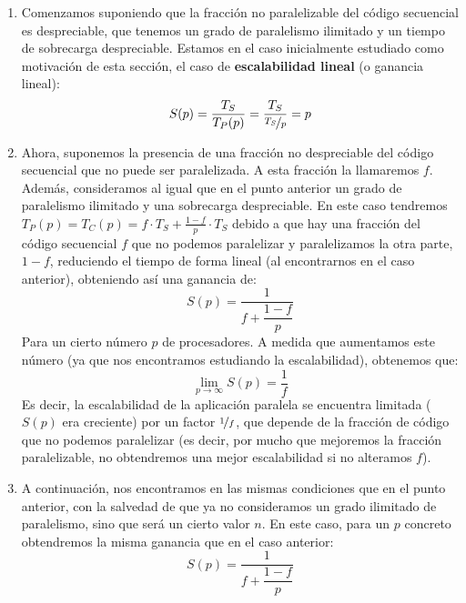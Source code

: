 \begin{enumerate}
    \item Comenzamos suponiendo que la fracción no paralelizable del código secuencial es despreciable, que tenemos un grado de paralelismo ilimitado y un tiempo de sobrecarga despreciable. Estamos en el caso inicialmente estudiado como motivación de esta sección, el caso de \textbf{escalabilidad lineal} (o ganancia lineal):
        \begin{equation*}
            S(p) = \dfrac{T_S}{T_P(p)} = \dfrac{T_S}{\nicefrac{T_S}{p}} = p
        \end{equation*}
    \item Ahora, suponemos la presencia de una fracción no despreciable del código secuencial que no puede ser paralelizada. A esta fracción la llamaremos $f$. Además, consideramos al igual que en el punto anterior un grado de paralelismo ilimitado y una sobrecarga despreciable. En este caso tendremos $T_P(p) = T_C(p) = f\cdot T_S + \frac{1-f}{p}\cdot T_S$ debido a que hay una fracción del código secuencial $f$ que no podemos paralelizar y paralelizamos la otra parte, $1-f$, reduciendo el tiempo de forma lineal (al encontrarnos en el caso anterior), obteniendo así una ganancia de:
        \begin{equation*}
            S(p) = \dfrac{1}{f+\dfrac{1-f}{p}}
        \end{equation*}
        Para un cierto número $p$ de procesadores. A medida que aumentamos este número (ya que nos encontramos estudiando la escalabilidad), obtenemos que:
        \begin{equation*}
            \lim_{p\to\infty}S(p) = \dfrac{1}{f}
        \end{equation*}
        Es decir, la escalabilidad de la aplicación paralela se encuentra limitada ($S(p)$ era creciente) por un factor $\nicefrac{1}{f}$, que depende de la fracción de código que no podemos paralelizar (es decir, por mucho que mejoremos la fracción paralelizable, no obtendremos una mejor escalabilidad si no alteramos $f$).
    \item A continuación, nos encontramos en las mismas condiciones que en el punto anterior, con la salvedad de que ya no consideramos un grado ilimitado de paralelismo, sino que será un cierto valor $n$. En este caso, para un $p$ concreto obtendremos la misma ganancia que en el caso anterior:
        \begin{equation*}
            S(p) = \dfrac{1}{f+\dfrac{1-f}{p}}
        \end{equation*}

\end{enumerate}
